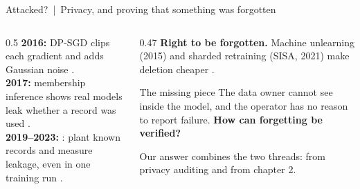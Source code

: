 \documentclass[aspectratio=169,10pt]{beamer}
\begin{document}
\begin{frame}{Attacked? \,|\, Privacy, and proving that something was forgotten}
\begin{columns}[T]
\begin{column}{0.5\textwidth}
\vspace{1mm}
{\footnotesize\textbf{2016:} DP-SGD clips each gradient and adds Gaussian noise .\\[2pt]
\textbf{2017:} membership inference shows real models leak whether a record was used .\\[2pt]
\textbf{2019--2023:} : plant known records and measure leakage, even in one training run .}
\end{column}
\begin{column}{0.47\textwidth}
{\footnotesize\textbf{Right to be forgotten.} Machine unlearning (2015) and sharded retraining (SISA, 2021) make deletion cheaper .}

\vspace{2mm}
\begin{alertblock}{The missing piece}
{\footnotesize The data owner cannot see inside the model, and the operator has no reason to report failure. \textbf{How can forgetting be verified?}}
\end{alertblock}
\vspace{1mm}
{\footnotesize Our answer combines the two threads:  from privacy auditing and  from chapter 2.}
\end{column}
\end{columns}
\end{frame}
\end{document}
